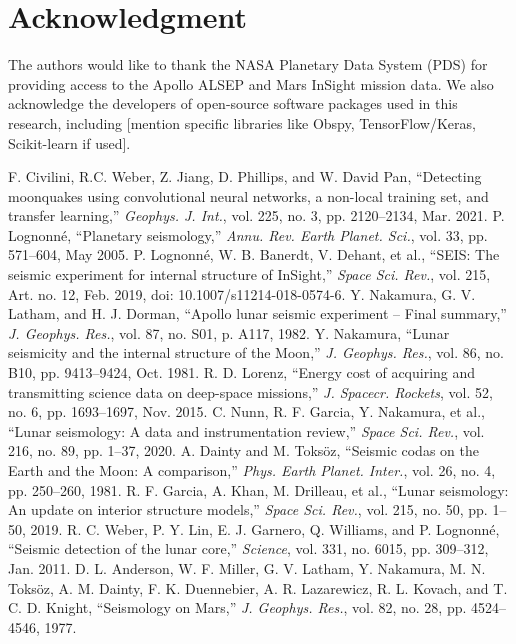 \documentclass[conference]{IEEEtran}
\begin{document}
\section*{Acknowledgment}
The authors would like to thank the NASA Planetary Data System (PDS) for providing access to the Apollo ALSEP and Mars InSight mission data. We also acknowledge the developers of open-source software packages used in this research, including [mention specific libraries like Obspy, TensorFlow/Keras, Scikit-learn if used].

\begin{thebibliography}{00}
     F. Civilini, R.C. Weber, Z. Jiang, D. Phillips, and W. David Pan, ``Detecting moonquakes using convolutional neural networks, a non-local training set, and transfer learning,'' \emph{Geophys. J. Int.}, vol. 225, no. 3, pp. 2120--2134, Mar. 2021.
      P. Lognonné, ``Planetary seismology,'' \emph{Annu. Rev. Earth Planet. Sci.}, vol. 33, pp. 571--604, May 2005.
     P. Lognonné, W. B. Banerdt, V. Dehant, et al., ``SEIS: The seismic experiment for internal structure of InSight,'' \emph{Space Sci. Rev.}, vol. 215, Art. no. 12, Feb. 2019, doi: 10.1007/s11214-018-0574-6.
     Y. Nakamura, G. V. Latham, and H. J. Dorman, ``Apollo lunar seismic experiment – Final summary,'' \emph{J. Geophys. Res.}, vol. 87, no. S01, p. A117, 1982.
     Y. Nakamura, ``Lunar seismicity and the internal structure of the Moon,'' \emph{J. Geophys. Res.}, vol. 86, no. B10, pp. 9413--9424, Oct. 1981.
     R. D. Lorenz, ``Energy cost of acquiring and transmitting science data on deep-space missions,'' \emph{J. Spacecr. Rockets}, vol. 52, no. 6, pp. 1693--1697, Nov. 2015.
     C. Nunn, R. F. Garcia, Y. Nakamura, et al., ``Lunar seismology: A data and instrumentation review,'' \emph{Space Sci. Rev.}, vol. 216, no. 89, pp. 1--37, 2020.
     A. Dainty and M. Toksöz, ``Seismic codas on the Earth and the Moon: A comparison,'' \emph{Phys. Earth Planet. Inter.}, vol. 26, no. 4, pp. 250--260, 1981.
     R. F. Garcia, A. Khan, M. Drilleau, et al., ``Lunar seismology: An update on interior structure models,'' \emph{Space Sci. Rev.}, vol. 215, no. 50, pp. 1--50, 2019.
     R. C. Weber, P. Y. Lin, E. J. Garnero, Q. Williams, and P. Lognonné, ``Seismic detection of the lunar core,'' \emph{Science}, vol. 331, no. 6015, pp. 309--312, Jan. 2011.
     D. L. Anderson, W. F. Miller, G. V. Latham, Y. Nakamura, M. N. Toksöz, A. M. Dainty, F. K. Duennebier, A. R. Lazarewicz, R. L. Kovach, and T. C. D. Knight, ``Seismology on Mars,'' \emph{J. Geophys. Res.}, vol. 82, no. 28, pp. 4524--4546, 1977.

\end{thebibliography}
\end{document}
